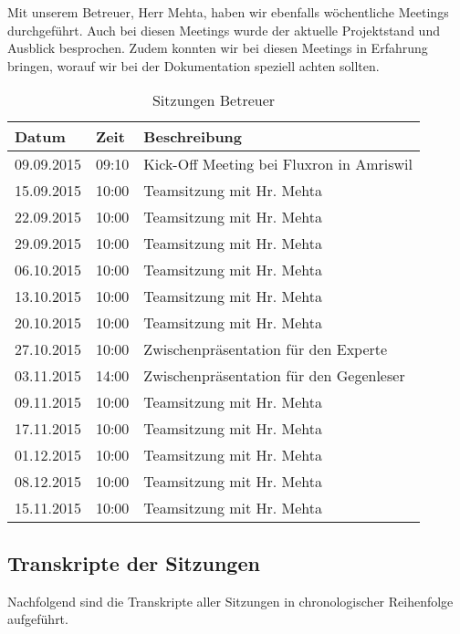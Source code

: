 Mit unserem Betreuer, Herr Mehta, haben wir ebenfalls wöchentliche Meetings durchgeführt. Auch bei diesen Meetings wurde der aktuelle Projektstand und Ausblick besprochen. Zudem konnten wir bei diesen Meetings in Erfahrung bringen, worauf wir bei der Dokumentation speziell achten sollten.

\begin{table}[H]
\begin{tabularx}{\textwidth}{ l | l | X}
\textbf{Datum}& \textbf{Zeit} & \textbf{Beschreibung}\\ \hline
09.09.2015 & 09:10 & Kick-Off Meeting bei Fluxron in Amriswil\\ \hline
15.09.2015 & 10:00 & Teamsitzung mit Hr. Mehta\\ \hline
22.09.2015 & 10:00 & Teamsitzung mit Hr. Mehta\\ \hline
29.09.2015 & 10:00 & Teamsitzung mit Hr. Mehta\\ \hline
06.10.2015 & 10:00 & Teamsitzung mit Hr. Mehta\\ \hline
13.10.2015 & 10:00 & Teamsitzung mit Hr. Mehta\\ \hline
20.10.2015 & 10:00 & Teamsitzung mit Hr. Mehta\\ \hline
27.10.2015 & 10:00 & Zwischenpräsentation für den Experte\\ \hline
03.11.2015 & 14:00 & Zwischenpräsentation für den Gegenleser\\ \hline
09.11.2015 & 10:00 & Teamsitzung mit Hr. Mehta\\ \hline
17.11.2015 & 10:00 & Teamsitzung mit Hr. Mehta\\ \hline
01.12.2015 & 10:00 & Teamsitzung mit Hr. Mehta\\ \hline
08.12.2015 & 10:00 & Teamsitzung mit Hr. Mehta\\ \hline
15.11.2015 & 10:00 & Teamsitzung mit Hr. Mehta\\ \hline
\end{tabularx}
\caption{Sitzungen Betreuer}
\end{table}

\subsection{Transkripte der Sitzungen}
\label{sub:sitzungs_transkripte}

Nachfolgend sind die Transkripte aller Sitzungen in chronologischer Reihenfolge aufgeführt.

